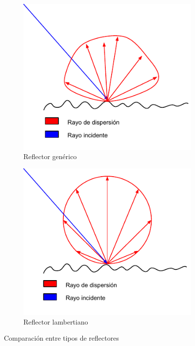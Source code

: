 \vspace{5mm}
\begin{figure}[h]
	\centering
	\begin{subfigure}{0.45\textwidth}
		\includegraphics[width=1\linewidth]{assets/difusa}
		\caption{Reflector genérico}
	\end{subfigure}
	\begin{subfigure}{0.45\textwidth}
		\includegraphics[width=1\linewidth]{assets/lambert}
		\caption{Reflector lambertiano}
	\end{subfigure}
	\caption{Comparación entre tipos de reflectores}
	\label{img:lamber}
\end{figure}

